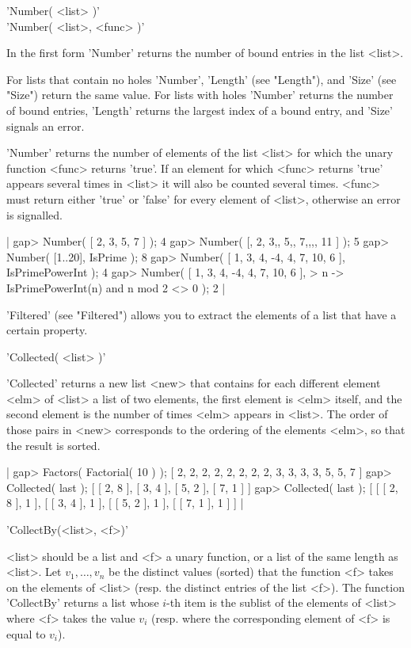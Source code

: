 'Number( <list> )' \\
'Number( <list>, <func> )'

In the first  form 'Number' returns  the number of  bound entries  in the
list <list>.

For  lists that contain no holes  'Number',  'Length' (see "Length"), and
'Size' (see "Size") return the same value.  For lists with holes 'Number'
returns  the number of bound entries,  'Length' returns the largest index
of a bound entry, and 'Size' signals an error.

'Number' returns the number of elements of the list <list> for  which the
unary function <func> returns 'true'.   If an   element for which  <func>
returns 'true'  appears several times in <list>  it  will also be counted
several times.   <func> must return either  'true' or  'false'  for every
element of <list>, otherwise an error is signalled.

|    gap> Number( [ 2, 3, 5, 7 ] );
    4
    gap> Number( [, 2, 3,, 5,, 7,,,, 11 ] );
    5
    gap> Number( [1..20], IsPrime );
    8
    gap> Number( [ 1, 3, 4, -4, 4, 7, 10, 6 ], IsPrimePowerInt );
    4
    gap> Number( [ 1, 3, 4, -4, 4, 7, 10, 6 ],
    >            n -> IsPrimePowerInt(n) and n mod 2 <> 0 );
    2 |
    
'Filtered' (see "Filtered") allows you to extract the  elements of a list
that have a certain property.


'Collected( <list> )'

'Collected' returns  a new list  <new> that  contains for each  different
element <elm> of  <list> a list  of two  elements, the first  element  is
<elm> itself, and the second element is the number of times <elm> appears
in <list>.  The order of those pairs in <new> corresponds to the ordering
of the elements <elm>, so that the result is sorted.

|    gap> Factors( Factorial( 10 ) );
    [ 2, 2, 2, 2, 2, 2, 2, 2, 3, 3, 3, 3, 5, 5, 7 ]
    gap> Collected( last );
    [ [ 2, 8 ], [ 3, 4 ], [ 5, 2 ], [ 7, 1 ] ]
    gap> Collected( last );
    [ [ [ 2, 8 ], 1 ], [ [ 3, 4 ], 1 ], [ [ 5, 2 ], 1 ], [ [ 7, 1 ], 1 ] ] |

%

'CollectBy(<list>, <f>)'

<list>  should be a  list and <f>  a unary function,  or a list of the same
length as <list>. Let $v_1,\ldots,v_n$ be the distinct values (sorted) that
the  function  <f>  takes  on  the  elements  of <list> (resp. the distinct
entries  of the  list <f>).  The function  'CollectBy' returns a list whose
$i$-th  item is the sublist  of the elements of  <list> where <f> takes the
value  $v_i$  (resp.  where  the  corresponding  element of <f> is equal to
$v_i$).

